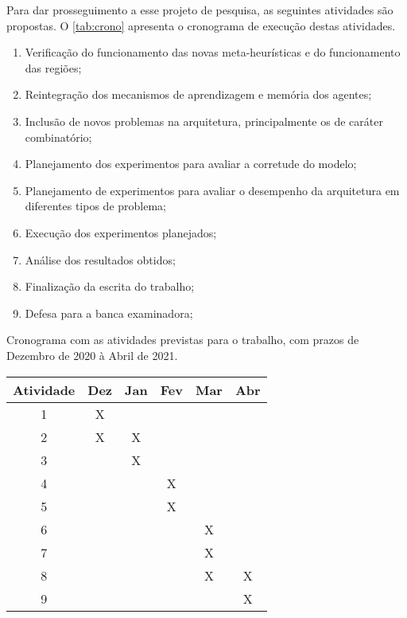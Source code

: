 Para dar prosseguimento a esse projeto de pesquisa, as seguintes atividades são propostas. O \autoref{tab:crono} apresenta o cronograma de execução destas atividades.

\begin{enumerate}
    \item Verificação do funcionamento das novas meta-heurísticas e do funcionamento das regiões;
    \item Reintegração dos mecanismos de aprendizagem e memória dos agentes;
    \item Inclusão de novos problemas na arquitetura, principalmente os de caráter combinatório;
    \item Planejamento dos experimentos para avaliar a corretude do modelo;
    \item Planejamento de experimentos para avaliar o desempenho da arquitetura em diferentes tipos de problema; 
    \item Execução dos experimentos planejados;
    \item Análise dos resultados obtidos;
    \item Finalização da escrita do trabalho;
    \item Defesa para a banca examinadora;
\end{enumerate}

\begin{quadro}
\caption{\label{tab:crono}Cronograma com as atividades previstas para o trabalho, com prazos de Dezembro de 2020 à Abril de 2021.}
\centering
\begin{tabular}{|c|c|c|c|c|c|}
    \hline
     \textbf{Atividade} & \textbf{Dez} & \textbf{Jan} & \textbf{Fev} & \textbf{Mar} & \textbf{Abr}   \\
     \hline
     1 & X &   &   &   &\\
     \hline
     2 & X & X &   &   &\\
     \hline
     3 &   & X &   &   &\\
     \hline
     4 &   &   & X &   &\\
     \hline
     5 &   &   & X &   &\\
     \hline
     6 &   &   &   & X & \\
     \hline
     7 &   &   &   & X & \\
     \hline
     8 &   &   &   & X & X \\
     \hline
     9 &   &   &   &   & X\\
     \hline
\end{tabular}
\end{quadro}